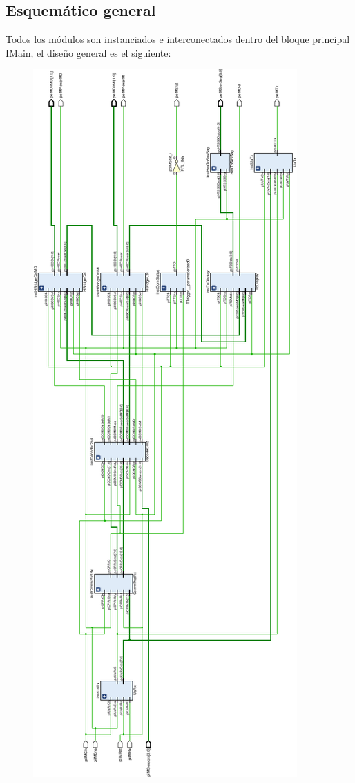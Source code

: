 \documentclass[12pt]{article}
\begin{document}
\subsection{Esquemático general}
Todos los módulos son instanciados e interconectados dentro del bloque principal IMain, el diseño general es el siguiente:
\begin{figure}[H]
    \centering 
	\includegraphics{Integrador-crop}
\end{figure}
\end{document}
